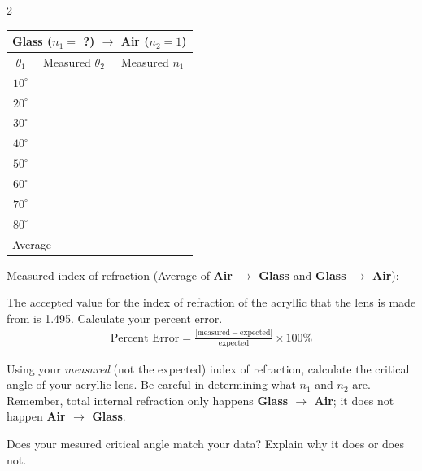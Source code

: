 \documentclass[10pt]{exam}
\begin{document}
\begin{questions}
\begin{multicols}{2}
      \columnbreak

      \begin{tabular}{|c|c|c|}
        \hline
        \multicolumn{3}{|c|}{{\bf Glass ($n_1=$ ?) $\rightarrow$ Air ($n_2=1$)}} 
        \\\hline
        $\theta_1$ &
        Measured $\theta_2$ &
        Measured $n_1$ \\\hline
        $10^\circ$ && \\\hline
        $20^\circ$ && \\\hline
        $30^\circ$ && \\\hline
        $40^\circ$ && \\\hline
        $50^\circ$ && \\\hline
        $60^\circ$ && \\\hline
        $70^\circ$ && \\\hline
        $80^\circ$ && \\\hline
        \multicolumn{2}{|l|}{Average} & \\\hline
      \end{tabular}
    \end{multicols}

    \vs

    Measured index of refraction (Average of {\bf Air $\rightarrow$ Glass} and {\bf Glass $\rightarrow$ Air}): \fillin

  
\pagebreak 

  \question The accepted value for the index of refraction of the acryllic that the lens is made from is 1.495.  Calculate your percent error.
  \begin{align*}
    \text{Percent Error} = \frac{\left| \text{measured} - \text{expected}  \right|}{\text{expected}} \times 100\%
  \end{align*}
  \vs 


  \question Using your \emph{measured} (not the expected) index of refraction, calculate the critical angle of your acryllic lens.  Be careful in determining what $n_1$ and $n_2$ are.  Remember, total internal refraction only happens {\bf Glass $\rightarrow$ Air}; it does not happen {\bf Air $\rightarrow$ Glass}. \vs 

  \question Does your mesured critical angle match your data?  Explain why it does or does not. \vs

\end{questions}
\end{document}
